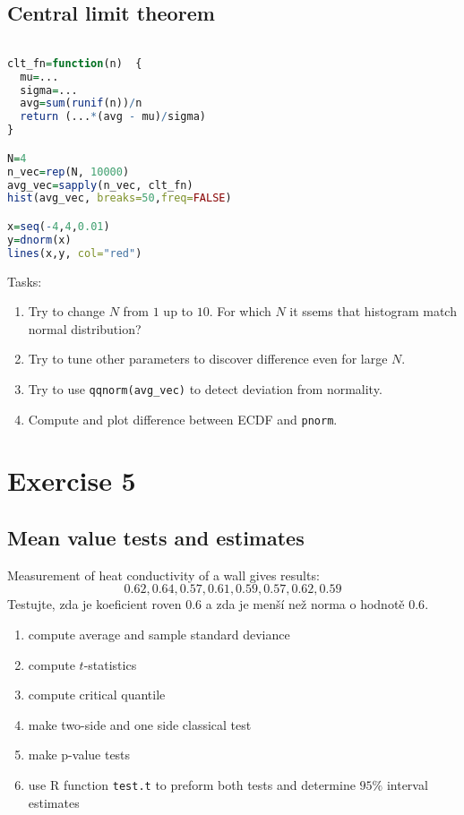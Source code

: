 \documentclass[4pt]{article}
\begin{document}
\subsection{Central limit theorem}
\begin{lstlisting}[language=r]

clt_fn=function(n)  {
  mu=...
  sigma=...
  avg=sum(runif(n))/n
  return (...*(avg - mu)/sigma)
}  

N=4
n_vec=rep(N, 10000)
avg_vec=sapply(n_vec, clt_fn)
hist(avg_vec, breaks=50,freq=FALSE)

x=seq(-4,4,0.01)
y=dnorm(x)
lines(x,y, col="red")
\end{lstlisting}
Tasks:
\begin{enumerate}
 \item Try to change $N$ from $1$ up to $10$. For which $N$ it ssems that histogram match normal distribution?
 \item Try to tune other parameters to discover difference even for large $N$.
 \item Try to use \verb'qqnorm(avg_vec)' to detect deviation from normality.
 \item Compute and plot difference between ECDF and \verb'pnorm'.
\end{enumerate}

\pagebreak


\section{Exercise 5}

\subsection{Mean value tests and estimates}
Measurement of heat conductivity of a wall gives results:
\[
    0.62, 0.64, 0.57,0.61, 0.59, 0.57, 0.62, 0.59
\]
Testujte, zda je koeficient roven $0.6$ a zda je menší než norma o hodnotě $0.6$.

\begin{enumerate}
 \item compute average and sample standard deviance
 \item compute $t$-statistics
 \item compute critical quantile
 \item make two-side and one side classical test
 \item make p-value tests
 \item use R function \verb'test.t' to preform both tests and determine $95\%$ interval estimates
\end{enumerate}
\end{document}
